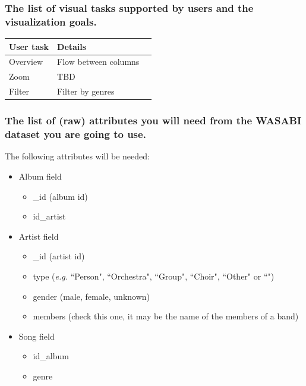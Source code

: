 \documentclass[a4paper, 11pt, oneside]{article}
\begin{document}
\subsubsection*{The list of visual tasks supported by users and the visualization goals.}
\begin{center}
    \begin{tabular}{lll}
        \hline
        \multicolumn{1}{c}{\textbf{User task}} & \textbf{Details}     \\ \hline
        Overview                               & Flow between columns \\ \hline
        Zoom                                   & TBD                  \\ \hline
        Filter                                 & Filter by genres     \\
    \end{tabular}
\end{center}

\subsubsection*{The list of (raw) attributes you will need from the WASABI dataset you are going to use.}
The following attributes will be needed:
\begin{itemize}
    \item Album field
          \begin{itemize}
              \item \_id (album id)
              \item id\_artist
          \end{itemize}
    \item Artist field
          \begin{itemize}
              \item \_id (artist id)
              \item type (\textit{e.g.} ``Person", ``Orchestra", ``Group", ``Choir", ``Other" or ``")
              \item gender (male, female, unknown)
              \item members (check this one, it may be the name of the members of a band)
          \end{itemize}
    \item Song field
          \begin{itemize}
              \item id\_album
              \item genre
          \end{itemize}
\end{itemize}
\end{document}
